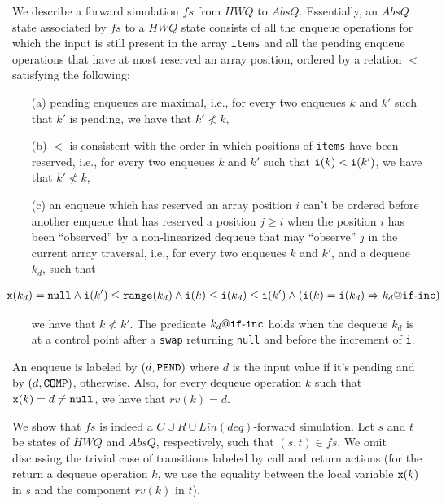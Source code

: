 We describe a forward simulation $\mathit{fs}$ from $\mathit{HWQ}$ to $AbsQ$. Essentially, an $AbsQ$ state associated by $\mathit{fs}$ to a $\mathit{HWQ}$ state consists of all the  enqueue operations for which the input is still present in the array {\tt items} and all the pending enqueue operations that have at most reserved an array position, ordered by a relation $<$ satisfying the following: 
\begin{itemize}
	\item[(a)] pending enqueues are maximal, i.e., for every two enqueues $k$ and $k'$ such that $k'$ is pending, we have that $k'\not< k$,
	\item[(b)] $<$ is consistent with the order in which positions of {\tt items} have been reserved, i.e., for every two enqueues $k$ and $k'$ such that ${\tt i}(k) < {\tt i}(k')$, we have that $k' \not< k$,
	\item[(c)] an enqueue which has reserved an array position $i$ %
	can't be ordered before another enqueue that has reserved a position $j \geq i$ when the position $i$ has been ``observed'' by a non-linearized dequeue that may ``observe'' $j$ in the current array traversal, i.e., for every two enqueues $k$ and $k'$, and a dequeue $k_d$, such that 
	
	\noindent
	{\small
	\begin{align}
	\hspace{-8mm}
	{\tt x}(k_d)={\tt null} \land {\tt i}(k') \leq {\tt range}(k_d) \land {\tt i}(k) \leq {\tt i}(k_d) \leq {\tt i}(k')
	 \land ({\tt i}(k) = {\tt i}(k_d) => k_d\atCP {\tt if}\text{-}{\tt inc}) \label{eq:inst}
	\end{align}}
	
	\noindent
	we have that $k \not< k'$. The predicate $k_d\atCP {\tt if}\text{-}{\tt inc}$ holds when the dequeue $k_d$ is at a control point after a {\tt swap} returning {\tt null} and before the increment of {\tt i}.
\end{itemize}

An enqueue is labeled by $(d,{\tt PEND})$ where $d$ is the input value if it's pending and by  $(d,{\tt COMP})$, otherwise. Also, for every dequeue operation $k$ such that ${\tt x}(k)=d\neq {\tt null}$, we have that $rv(k)=d$.

We show that $\mathit{fs}$ is indeed a $C\cup R\cup Lin(deq)$-forward simulation. Let $s$ and $t$ be states of $\mathit{HWQ}$ and $AbsQ$, respectively, such that $(s,t)\in\mathit{fs}$. 
We omit discussing the trivial case of transitions labeled by call and return actions (for the return a dequeue operation $k$, we use the equality between the local variable ${\tt x}(k)$ in $s$ and the component $rv(k)$ in $t$). 

